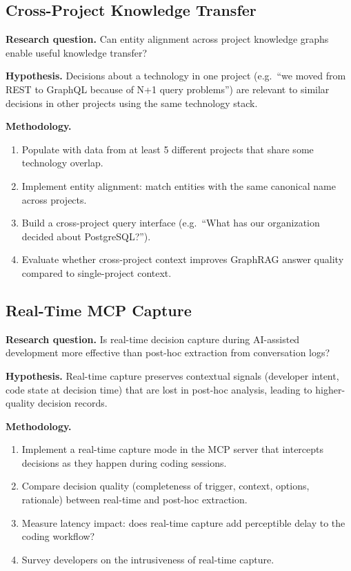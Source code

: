\subsection{Cross-Project Knowledge Transfer}
\label{sec:future-cross-project}

\noindent\textbf{Research question.}
Can entity alignment across project knowledge graphs enable useful
knowledge transfer?

\medskip\noindent\textbf{Hypothesis.}
Decisions about a technology in one project (e.g.\ ``we moved from REST
to GraphQL because of N+1 query problems'') are relevant to similar
decisions in other projects using the same technology stack.

\medskip\noindent\textbf{Methodology.}

\begin{enumerate}
    \item Populate \sysname{} with data from at least 5 different projects
          that share some technology overlap.
    \item Implement entity alignment: match entities with the same
          canonical name across projects.
    \item Build a cross-project query interface (e.g.\ ``What has our
          organization decided about PostgreSQL?'').
    \item Evaluate whether cross-project context improves GraphRAG answer
          quality compared to single-project context.
\end{enumerate}


\subsection{Real-Time MCP Capture}
\label{sec:future-realtime}

\noindent\textbf{Research question.}
Is real-time decision capture during AI-assisted development more
effective than post-hoc extraction from conversation logs?

\medskip\noindent\textbf{Hypothesis.}
Real-time capture preserves contextual signals (developer intent, code
state at decision time) that are lost in post-hoc analysis, leading to
higher-quality decision records.

\medskip\noindent\textbf{Methodology.}

\begin{enumerate}
    \item Implement a real-time capture mode in the MCP server that
          intercepts decisions as they happen during coding sessions.
    \item Compare decision quality (completeness of trigger, context,
          options, rationale) between real-time and post-hoc extraction.
    \item Measure latency impact: does real-time capture add perceptible
          delay to the coding workflow?
    \item Survey developers on the intrusiveness of real-time capture.
\end{enumerate}


